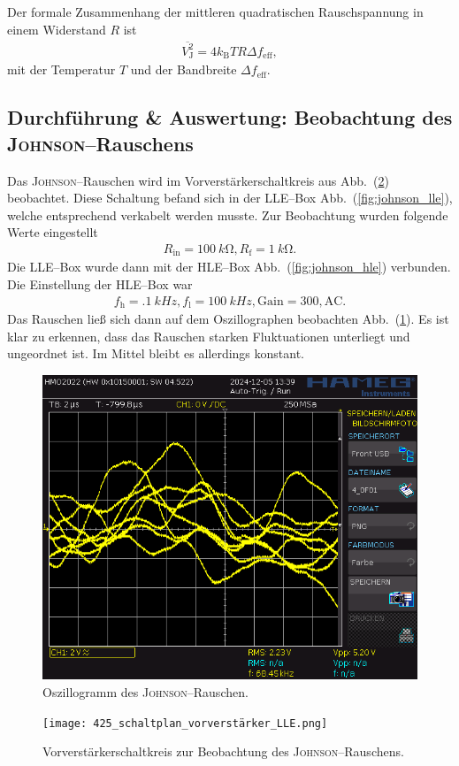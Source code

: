 \documentclass[sn-mathphys-num,iicol]{sn-jnl}
\theoremstyle{thmstyleone}
\theoremstyle{thmstyletwo}
\theoremstyle{thmstylethree}
\begin{document}
Der formale Zusammenhang der mittleren quadratischen Rauschspannung in einem Widerstand $R$ ist
\begin{align}
	\overline{V^2_\text{J}}=4k_\text{B}TR\Delta f_\text{eff}
	,\end{align}
mit der Temperatur $T$ und der Bandbreite $\Delta f_\text{eff}$.

\subsection{Durchführung \& Auswertung: Beobachtung des \textsc{Johnson}--Rauschens}
Das \textsc{Johnson}--Rauschen wird im Vorverstärkerschaltkreis aus Abb.\ (\ref{fig:vorverstärker}) beobachtet.
Diese Schaltung befand sich in der LLE--Box Abb.\ (\ref{fig:johnson_lle}), welche entsprechend verkabelt werden musste.
Zur Beobachtung wurden folgende Werte eingestellt
\begin{align}
	R_\text{in}=\SI{100}{k\ohm},R_\text{f}=\SI{1}{k\ohm}
	.\end{align}
Die LLE--Box wurde dann mit der HLE--Box Abb.\ (\ref{fig:johnson_hle}) verbunden.
Die Einstellung der HLE--Box war
\begin{align}
	f_\text{h}=\SI{.1}{kHz},f_\text{l}=\SI{100}{kHz},\text{Gain}=300,\text{AC}
	.\end{align}
Das Rauschen ließ sich dann auf dem Oszillographen beobachten Abb.\ (\ref{fig:johnson_oszi}).
Es ist klar zu erkennen, dass das Rauschen starken Fluktuationen unterliegt und ungeordnet ist.
Im Mittel bleibt es allerdings konstant.

\begin{figure}[t]
	\centering
	\includegraphics[width=.5\textwidth]{../data/4_0F01.png}
	\caption{Oszillogramm des \textsc{Johnson}--Rauschen.} \label{fig:johnson_oszi}
\end{figure}

\begin{figure}[t]
	\centering
	\texttt{[image: 425\_schaltplan\_vorverstärker\_LLE.png]}
	\caption{Vorverstärkerschaltkreis zur Beobachtung des \textsc{Johnson}--Rauschens.\cite{anleitung425}} \label{fig:vorverstärker}
\end{figure}
\end{document}
